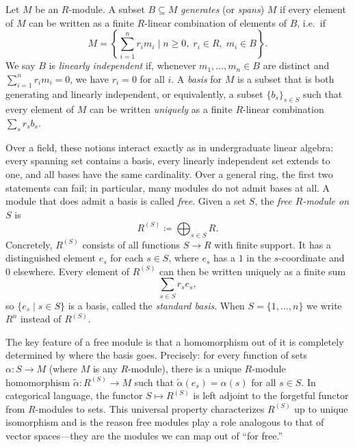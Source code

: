 \documentclass[12pt,reqno]{amsart}
\begin{document}
Let $M$ be an $R$-module. A subset $B \subseteq M$ \emph{generates} (or \emph{spans}) $M$ if every element of $M$ can be written as a finite $R$-linear combination of elements of $B$, i.e.\ if
\[
M = \left\{\sum_{i=1}^n r_i m_i \;\bigg|\; n\geq 0,\; r_i\in R,\; m_i\in B\right\}.
\]
We say $B$ is \emph{linearly independent} if, whenever $m_1,\ldots,m_n\in B$ are distinct and $\sum_{i=1}^n r_i m_i = 0$, we have $r_i=0$ for all $i$. A \emph{basis} for $M$ is a subset that is both generating and linearly independent, or equivalently, a subset $\{b_s\}_{s\in S}$ such that every element of $M$ can be written \emph{uniquely} as a finite $R$-linear combination $\sum_s r_s b_s$.
 
Over a field, these notions interact exactly as in undergraduate linear algebra: every spanning set contains a basis, every linearly independent set extends to one, and all bases have the same cardinality. Over a general ring, the first two statements can fail; in particular, many modules do not admit bases at all. A module that does admit a basis is called \emph{free}. Given a set $S$, the \emph{free $R$-module on $S$} is
\[
R^{(S)}\coloneqq \bigoplus_{s\in S}R.
\]
Concretely, $R^{(S)}$ consists of all functions $S\to R$ with finite support. It has a distinguished element $e_s$ for each $s\in S$, where $e_s$ has a $1$ in the $s$-coordinate and $0$ elsewhere. Every element of $R^{(S)}$ can then be written uniquely as a finite sum
\[
\sum_{s\in S}r_se_s,
\]
so $\{e_s\mid s\in S\}$ is a basis, called the \emph{standard basis}. When $S=\{1,\ldots,n\}$ we write $R^n$ instead of $R^{(S)}$.
 
The key feature of a free module is that a homomorphism out of it is completely determined by where the basis goes. Precisely: for every function of sets $\alpha\colon S\to M$ (where $M$ is any $R$-module), there is a unique $R$-module homomorphism $\widetilde{\alpha}\colon R^{(S)}\to M$ such that $\widetilde{\alpha}(e_s)=\alpha(s)$ for all $s\in S$. In categorical language, the functor $S\mapsto R^{(S)}$ is left adjoint to the forgetful functor from $R$-modules to sets. This universal property characterizes $R^{(S)}$ up to unique isomorphism and is the reason free modules play a role analogous to that of vector spaces---they are the modules we can map out of ``for free.''

\hrulefill
\end{document}
